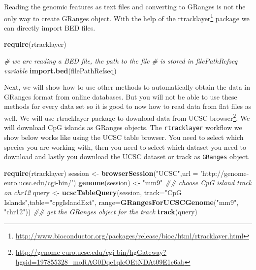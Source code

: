 \documentclass[12pt,]{krantz}
\newenvironment{Shaded}{\begin{snugshade}}{\end{snugshade}}
\newcommand{\CommentTok}[1]{\textcolor[rgb]{0.56,0.35,0.01}{\textit{#1}}}
\newcommand{\DataTypeTok}[1]{\textcolor[rgb]{0.13,0.29,0.53}{#1}}
\newcommand{\KeywordTok}[1]{\textcolor[rgb]{0.13,0.29,0.53}{\textbf{#1}}}
\newcommand{\NormalTok}[1]{#1}
\newcommand{\StringTok}[1]{\textcolor[rgb]{0.31,0.60,0.02}{#1}}
\renewcommand{\href}[2]{#2\footnote{\url{#1}}}
\begin{document}
Reading the genomic features as text files and converting to GRanges is not the only way to create GRanges object. With the help of the \href{http://www.bioconductor.org/packages/release/bioc/html/rtracklayer.html}{rtracklayer} package we can directly import BED files.

\begin{Shaded}
\begin{Highlighting}[]
\KeywordTok{require}\NormalTok{(rtracklayer)}

\CommentTok{# we are reading a BED file, the path to the file}
\CommentTok{# is stored in filePathRefseq variable}
\KeywordTok{import.bed}\NormalTok{(filePathRefseq)}
\end{Highlighting}
\end{Shaded}

Next, we will show how to use other methods to automatically obtain the data in GRanges format from online databases. But you will not be able to use these methods for every data set so it is good to now how to read data from flat files as well. We will use rtracklayer package to download data from \href{http://genome-euro.ucsc.edu/cgi-bin/hgGateway?hgsid=197855328_moRAG0Dqe1qlcOEtNDAt09E1e6ab}{UCSC browser}. We will download CpG islands as GRanges objects. The \texttt{rtracklayer} workflow we show below works like using the UCSC table browser. You need to select which species you are working with, then you need to select which dataset you need to download and lastly you download the UCSC dataset or track as \texttt{GRanges} object.

\begin{Shaded}
\begin{Highlighting}[]
\KeywordTok{require}\NormalTok{(rtracklayer)}
\NormalTok{session <-}\StringTok{ }\KeywordTok{browserSession}\NormalTok{(}\StringTok{"UCSC"}\NormalTok{,}\DataTypeTok{url =} \StringTok{'http://genome-euro.ucsc.edu/cgi-bin/'}\NormalTok{)}
\KeywordTok{genome}\NormalTok{(session) <-}\StringTok{ "mm9"}
\CommentTok{## choose CpG island track on chr12}
\NormalTok{query <-}\StringTok{ }\KeywordTok{ucscTableQuery}\NormalTok{(session, }\DataTypeTok{track=}\StringTok{"CpG Islands"}\NormalTok{,}\DataTypeTok{table=}\StringTok{"cpgIslandExt"}\NormalTok{,}
        \DataTypeTok{range=}\KeywordTok{GRangesForUCSCGenome}\NormalTok{(}\StringTok{"mm9"}\NormalTok{, }\StringTok{"chr12"}\NormalTok{))}
\CommentTok{## get the GRanges object for the track}
\KeywordTok{track}\NormalTok{(query)}
\end{Highlighting}
\end{Shaded}
\end{document}
